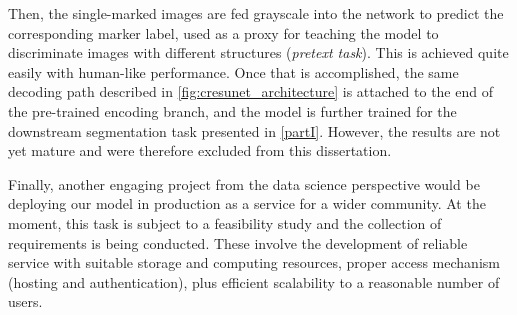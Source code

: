 Then, the single-marked images are fed grayscale into the network to predict the corresponding marker label, used as a proxy for teaching the model to discriminate images with different structures (\textit{pretext task}).
This is achieved quite easily with human-like performance.
Once that is accomplished, the same decoding path described in \cref{fig:cresunet_architecture} is attached to the end of the pre-trained encoding branch, and the model is further trained for the downstream segmentation task presented in \cref{partI}.
However, the results are not yet mature and were therefore excluded from this dissertation.

Finally, another engaging project from the data science perspective would be deploying our model in production as a service for a wider community. 
At the moment, this task is subject to a feasibility study and the collection of requirements is being conducted. These involve the development of reliable service with suitable storage and computing resources, proper access mechanism (hosting and authentication), plus efficient scalability to a reasonable number of users.